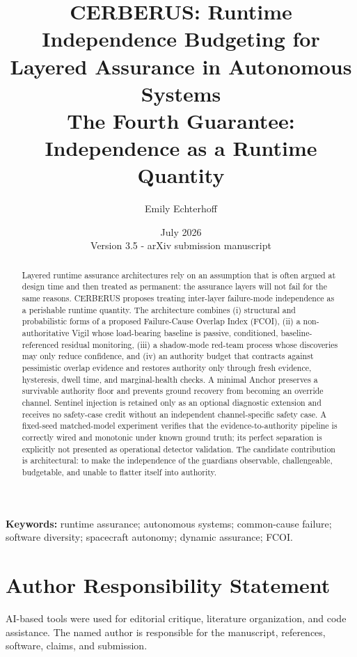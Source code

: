 \documentclass[10pt]{article}
\title{\textbf{CERBERUS: Runtime Independence Budgeting for Layered Assurance in Autonomous Systems}\\[2mm]
\large The Fourth Guarantee: Independence as a Runtime Quantity}
\author{Emily Echterhoff}
\affil{Independent Researcher}
\date{July 2026\\\small Version 3.5 - arXiv submission manuscript}
\begin{document}
\maketitle

\begin{abstract}
Layered runtime assurance architectures rely on an assumption that is often argued at design time and then treated as permanent: the assurance layers will not fail for the same reasons. CERBERUS proposes treating inter-layer failure-mode independence as a perishable runtime quantity. The architecture combines (i) structural and probabilistic forms of a proposed Failure-Cause Overlap Index (FCOI), (ii) a non-authoritative Vigil whose load-bearing baseline is passive, conditioned, baseline-referenced residual monitoring, (iii) a shadow-mode red-team process whose discoveries may only reduce confidence, and (iv) an authority budget that contracts against pessimistic overlap evidence and restores authority only through fresh evidence, hysteresis, dwell time, and marginal-health checks. A minimal Anchor preserves a survivable authority floor and prevents ground recovery from becoming an override channel. Sentinel injection is retained only as an optional diagnostic extension and receives no safety-case credit without an independent channel-specific safety case. A fixed-seed matched-model experiment verifies that the evidence-to-authority pipeline is correctly wired and monotonic under known ground truth; its perfect separation is explicitly not presented as operational detector validation. The candidate contribution is architectural: to make the independence of the guardians observable, challengeable, budgetable, and unable to flatter itself into authority.
\end{abstract}

\noindent\textbf{Keywords:} runtime assurance; autonomous systems; common-cause failure; software diversity; spacecraft autonomy; dynamic assurance; FCOI.






\section*{Author Responsibility Statement}
AI-based tools were used for editorial critique, literature organization, and code assistance. The named author is responsible for the manuscript, references, software, claims, and submission.

\small

\end{document}
